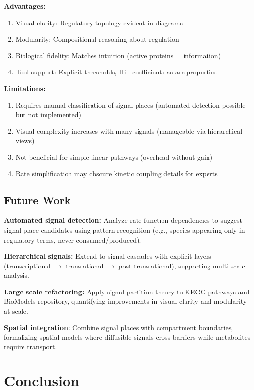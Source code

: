 \documentclass[twocolumn,10pt]{article}
\begin{document}
\textbf{Advantages:}
\begin{enumerate}
\item Visual clarity: Regulatory topology evident in diagrams
\item Modularity: Compositional reasoning about regulation
\item Biological fidelity: Matches intuition (active proteins = information)
\item Tool support: Explicit thresholds, Hill coefficients as arc properties
\end{enumerate}

\textbf{Limitations:}
\begin{enumerate}
\item Requires manual classification of signal places (automated detection possible but not implemented)
\item Visual complexity increases with many signals (manageable via hierarchical views)
\item Not beneficial for simple linear pathways (overhead without gain)
\item Rate simplification may obscure kinetic coupling details for experts
\end{enumerate}

\subsection{Future Work}

\textbf{Automated signal detection:} Analyze rate function dependencies to suggest signal place candidates using pattern recognition (e.g., species appearing only in regulatory terms, never consumed/produced).

\textbf{Hierarchical signals:} Extend to signal cascades with explicit layers (transcriptional $\rightarrow$ translational $\rightarrow$ post-translational), supporting multi-scale analysis.

\textbf{Large-scale refactoring:} Apply signal partition theory to KEGG pathways and BioModels repository, quantifying improvements in visual clarity and modularity at scale.

\textbf{Spatial integration:} Combine signal places with compartment boundaries, formalizing spatial models where diffusible signals cross barriers while metabolites require transport.

\section{Conclusion}
\end{document}
